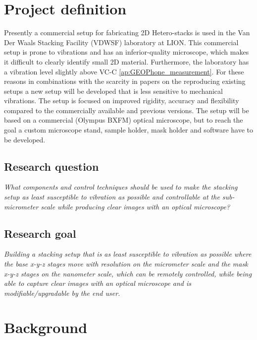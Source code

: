 \documentclass[10pt]{article}
\begin{document}
\section{Project definition}
\noindent Presently a commercial setup \cite{HQGrapheneSystemsDesigns} for fabricating 2D Hetero-stacks is used in the Van Der Waals Stacking Facility (VDWSF) laboratory at LION. 
This commercial setup is prone to vibrations and has an inferior-quality microscope, which makes it difficult to clearly identify small 2D material.
Furthermore, the laboratory has a vibration level slightly above VC-C \cite{isolationVibrationCriterionVC} \ref{ap:GEOPhone_measurement}.
For these reasons in combinations with the scarcity in papers on the reproducing existing setups \cite{gantSystemDeterministicTransfer2020,castellanos-gomezVanWaalsHeterostructures2022} a new setup will be developed that is less sensitive to mechanical vibrations.
The setup is focused on improved rigidity, accuracy and flexibility compared to the commercially available and previous versions.
The setup will be based on a commercial (Olympus BXFM) optical microscope, but to reach the goal a custom microscope stand, sample holder, mask holder and software have to be developed.

\subsection{Research question}
\begin{center}
    \textit{What components and control techniques should be used to make the stacking setup as least susceptible to vibration as possible and controllable at the sub-micrometer scale while producing clear images with an optical microscope?}
\end{center}

\subsection{Research goal}
\begin{center}
    \textit{Building a stacking setup that is as least susceptible to vibration as possible where the base x-y-z stages move with resolution on the micrometer scale and the mask x-y-z stages on the nanometer scale, which can be remotely controlled, while being able to capture clear images with an optical microscope and is modifiable/upgradable by the end user.}
\end{center}

\clearpage
\section{Background}
\end{document}
